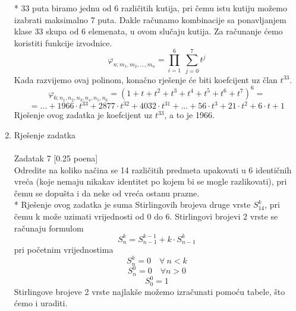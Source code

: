 \documentclass[12pt]{article}
\begin{document}
\begin{enumerate}
* 33 puta biramo jednu od 6 različitih kutija, pri čemu istu kutiju možemo
izabrati maksimalno 7 puta. Dakle računamo kombinacije sa ponavljanjem
klase 33 skupa od 6 elemenata, u ovom slučaju kutija. Za računanje ćemo
koristiti funkcije izvodnice.
\begin{equation*}
   \varphi_{n;m_1,m_2,...,m_n} = \prod_{i=1}^{6} ~ \sum_{j=0}^{7} t^j
\end{equation*}	
Kada razvijemo ovaj polinom, konačno rješenje će biti koefcijent uz član
$t^{33}$. 
\begin{equation*}
   \varphi_{6;n_1,n_2,n_3,n_4,n_5,n_6} = (1+t+t^2+t^3+t^4+t^5+t^6+t^7)^6 =
\end{equation*}	
\begin{equation*}
    = ... + 1966 \cdot t^{33} + 2877 \cdot t^{32} + 4032 \cdot t^{31} + ... + 56 \cdot t^3 + 21 \cdot t^2 + 6 \cdot t + 1
\end{equation*}	
Rješenje ovog zadatka je koefcijent uz $t^{33}$, a to je 1966. \\

		\item Rješenje zadatka \\
		\\
		Zadatak 7 [0.25 poena] \\
		
Odredite na koliko načina se 14 različitih predmeta upakovati u 6 identičnih
vreća (koje nemaju nikakav identitet po kojem bi se mogle razlikovati), pri
čemu se dopušta i da neke od vreća ostanu prazne. \\

* Rješenje ovog zadatka je suma Stirlingovih brojeva druge vrste $S^k_{14}$, pri
čemu k može uzimati vrijednosti od 0 do 6. Stirlingovi brojevi 2 vrste se računaju formulom
\begin{equation*}
S^k_n = S^{k-1}_{n-1} + k \cdot S^k_{n-1}
\end{equation*}
pri početnim vrijednostima
\begin{equation*}
S^k_n = 0 \quad \forall ~ n < k
\end{equation*}
\begin{equation*}
S^0_n = 0 \quad \forall n > 0 
\end{equation*}
\begin{equation*}
S^0_0 = 1 
\end{equation*}
Stirlingove brojeve 2 vrste najlakše možemo izračunati pomoću tabele, što ćemo i uraditi. \\
\newpage


\end{enumerate}
\end{document}
